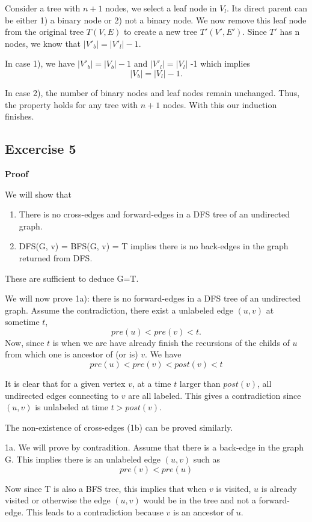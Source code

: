 \documentclass[a4paper,10pt,twoside]{article}
\begin{document}
	Consider a tree with $n+1$ nodes, we select a leaf node in $V_l$. Its direct
	parent can be either 1) a binary node or 2) not a binary node. We now remove
	this leaf node from the original tree $T(V, E)$ to create a new tree $T'(V', E')$.
	Since $T'$ has n nodes, we know that $|V'_b| = |V'_l| - 1$.

	In case 1), we have $|V'_b| = |V_b| - 1$ and $|V'_l| = |V_l|$ -1 which implies
	\[
		|V_b| = |V_l| -1.
	\]

	In case 2), the number of binary nodes and leaf nodes remain unchanged.
	Thus, the property holds for any tree with $n+1$ nodes. With this our induction
	finishes.

\subsection*{Excercise 5}

\textbf{Proof}

	We will show that 
	\begin{enumerate}
		\item There is no cross-edges and forward-edges in a DFS 
	tree of an undirected graph.
		\item DFS(G, v) = BFS(G, v) = T implies there is no
	back-edges in the graph returned from DFS.
	\end{enumerate}
	  These are sufficient to deduce G=T.

We will now prove 1a): there is no forward-edges in a DFS tree of 
an undirected graph. 
Assume the contradiction, there exist a unlabeled edge $(u, v)$ at 
sometime $t$,
\[
	pre(u) < pre(v) < t.
\]
Now, since $t$ is when we are have already finish the recursions of
the childs of $u$ from which one is ancestor of (or is) $v$. We have
\[
 	pre(u) < pre(v) < post(v) < t
 \] 

It is clear that for a given vertex
$v$, at a time $t$ larger than $post(v)$, all undirected edges
connecting to $v$ are all labeled. This gives a contradiction since
$(u, v)$ is unlabeled at time $t > post(v)$.

The non-existence of cross-edges (1b) can be proved similarly.


1a. We will prove by contradition. Assume that there is a back-edge
in the graph G. This implies there is an unlabeled edge $(u, v)$ 
such as
\[
	pre(v) < pre(u)
\]
 
Now since T is also a BFS tree, this implies that when $v$ is visited,
$u$ is already visited or otherwise the edge $(u, v)$ would be in the tree
and not a forward-edge. This leads to a contradiction because $v$ is an
ancestor of $u$. 
\end{document}
